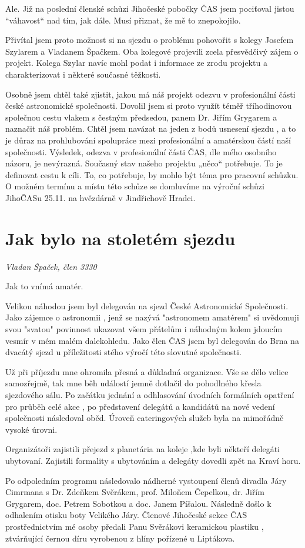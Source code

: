 \documentclass[10pt,a5paper,twoside]{book}
\newcommand{\nadpis}[2]{
\section*{#1}
	\begin{flushright}
	\textit{#2}
	\end{flushright}
}
\begin{document}
Ale. Již na poslední členské schůzi Jihočeské pobočky ČAS jsem pociťoval jistou “váhavost“ nad tím, jak dále. Musí přiznat, že mě to znepokojilo.


Přivítal jsem proto možnost si na sjezdu o problému pohovořit s kolegy Josefem Szylarem a Vladanem Špačkem. Oba kolegové projevili zcela přesvědčivý zájem o projekt. Kolega Szylar navíc mohl podat i informace ze zrodu projektu a charakterizovat i některé současné těžkosti.



Osobně jsem chtěl také zjistit, jakou má náš projekt odezvu v profesionální části české astronomické společnosti. Dovolil jsem si proto využít téměř tříhodinovou společnou cestu vlakem s čestným předsedou, panem Dr. Jiřím Grygarem a naznačit náš problém. Chtěl jsem navázat na jeden z bodů usnesení sjezdu , a to je důraz na prohlubování spolupráce mezi profesionální a amatérskou částí naší společnosti. Výsledek, odezva v profesionální části ČAS, dle mého osobního názoru, je nevýrazná.
Současný stav našeho projektu „něco“ potřebuje. To je definovat cestu k cíli. To, co potřebuje, by mohlo být téma pro pracovní schůzku. O možném termínu a místu této schůze se domluvíme na výroční schůzi JihoČASu 25.11. na hvězdárně v Jindřichově Hradci.



\nadpis{Jak bylo na stoletém sjezdu}{Vladan Špaček, člen 3330}
Jak to vnímá amatér.


Velikou náhodou jsem byl delegován na sjezd České Astronomické Společnosti. Jako zájemce o astronomii , jenž se nazývá  "astronomem  amatérem" si uvědomuji svou "svatou"  povinnost ukazovat všem přátelům i náhodným kolem jdoucím vesmír v mém malém dalekohledu.  Jako člen ČAS jsem byl delegován do Brna na dvacátý sjezd u příležitosti  stého výročí této slovutné společnosti.


Už při příjezdu mne ohromila přesná a důkladná organizace. Vše se dělo velice samozřejmě, tak mne běh událostí jemně dotlačil do pohodlného křesla sjezdového sálu. Po začátku jednání a odhlasování úvodních formálních opatření pro průběh celé akce , po představení delegátů a kandidátů na nové vedení  společnosti následoval oběd. Úroveň cateringových služeb byla na mimořádně vysoké úrovni.


Organizátoři zajistili přejezd z planetária na koleje ,kde byli někteří delegáti ubytovaní. Zajistili formality s ubytováním a delegáty dovedli zpět na Kraví horu.


Po odpoledním programu následovalo nádherné vystoupení členů divadla Járy Cimrmana s  Dr. Zdeňkem  Svěrákem, prof. Miloňem Čepelkou, dr. Jiřím Grygarem, doc. Petrem Sobotkou a doc. Janem  Píšalou. Následně došlo k odhalením otisku boty Velikého Járy. Členové Jihočeské sekce ČAS prostřednictvím mé osoby předali  Panu Svěrákovi keramickou plastiku , ztvárňující černou díru vyrobenou z hlíny pořízené u Liptákova.
\end{document}

